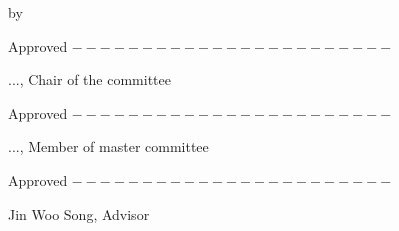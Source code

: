 \documentclass[
11pt, %
english, %
doublespacing, %
liststotoc, %
headsepline, %
]{MastersDoctoralThesis} %
\begin{document}
\begin{titlepage}
	\begin{center}
		
		\vspace*{.01\textheight}
		
		{\bfseries \fontsize{16}{20}\selectfont \ttitle\par}\vspace{2cm} 
		
		{\fontsize{11}{11}\selectfont by\par}\vspace{0.2cm} 
		
		{\fontsize{14}{12}\selectfont \authorname\par}\vspace{2cm} 
		
		{\fontsize{14}{1}\selectfont Approved 
			\fontsize{10}{1}\selectfont
			{$-----------------------$}
			\\ 
			\begin{flushleft}
				\hspace{3.8cm}
				\fontsize{12}{11}\selectfont
				..., Chair of the committee
			\end{flushleft}
			}\vspace{1.6cm} 

		{\fontsize{14}{1}\selectfont Approved 
		\fontsize{10}{1}\selectfont
		{$-----------------------$}
		\\
		\begin{flushleft}
			\hspace{3.8cm}
			\fontsize{12}{11}\selectfont
			..., Member of master committee
		\end{flushleft}
		}\vspace{1.6cm} 

		{\fontsize{14}{1}\selectfont Approved 
		\fontsize{10}{1}\selectfont
		{$-----------------------$}
		\\
		\begin{flushleft}
			\hspace{3.8cm}
			\fontsize{12}{11}\selectfont
			Jin Woo Song, Advisor
		\end{flushleft}   
		}\vspace{1.6cm} 
		
		\vfill
	\end{center}
\end{titlepage}
	
	
\end{document}
